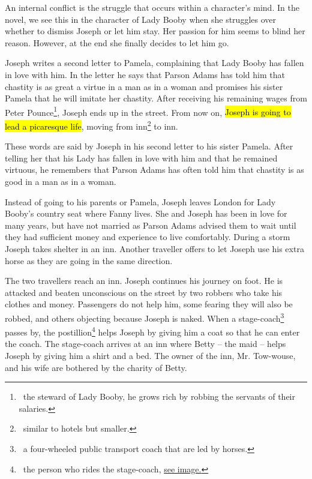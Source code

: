 \documentclass[12pt, a4paper]{article}
\begin{document}


An internal conflict is the struggle that occurs within a character's mind. In the novel,
we see this in the character of Lady Booby when she struggles over whether to dismiss Joseph
or let him stay. Her passion for him seems to blind her reason. However, at the end she finally
decides to let him go.



\ind Joseph writes a second letter to Pamela, complaining that Lady Booby has fallen in
love with him. In the letter he says that Parson Adams has told him that chastity 
is as great a virtue in a man as in a woman and promises his sister Pamela that he will
imitate her chastity. After receiving his remaining wages from Peter Pounce\footnote{\,
the steward of Lady Booby, he grows rich by robbing the servants of their salaries.}, Joseph ends up in
the street. From now on, \hl{Joseph is going to lead a picaresque life}, moving from inn\footnote{\,
similar to hotels but smaller.} to inn.




These words are said by Joseph in his second letter to his sister Pamela. After telling her
that his Lady has fallen in love with him and that he remained virtuous, he remembers that
Parson Adams has often told him that chastity is as good in a man as in a woman.


\ind Instead of going to his parents or Pamela, Joseph leaves London for 
Lady Booby's country seat where Fanny lives. She and Joseph has been in
love for many years, but have not married as Parson Adams advised them
to wait until they had sufficient money and experience to live 
comfortably. During a storm Joseph takes shelter in an inn. Another traveller offers
to let Joseph use his extra horse as they are going in the same direction.
  



\ind The two travellers reach an inn. Joseph continues his journey on foot. He
is attacked and beaten unconscious on the street by two robbers who take his clothes
and money. Passengers do not help him, some fearing they will also be
robbed, and others objecting because Joseph is naked. When a stage-coach\footnote{\, 
a four-wheeled public transport coach that are led by horses.} passes by,
the postillion\footnote{\, the person who rides the stage-coach, \textcolor{blue}
{\href{https://westervillelibrary.org/wp-content/uploads/sites/116/2022/01/Drawing-of-Stagecoach.png}
{see image.}}} helps Joseph by giving him a coat so that he can enter the 
coach. The stage-coach arrives at an inn where Betty -- the maid -- helps
Joseph by giving him a shirt and a bed. The owner of the inn, Mr. Tow-wouse,  and his wife 
are bothered by the charity of Betty.
\end{document}

